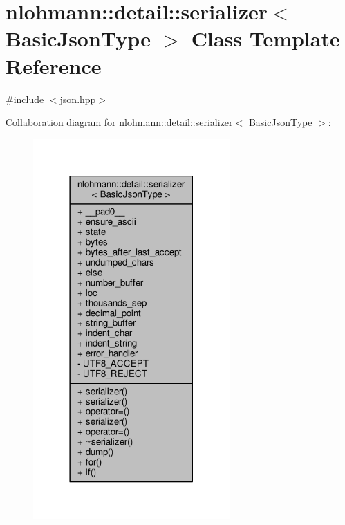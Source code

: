 \hypertarget{classnlohmann_1_1detail_1_1serializer}{}\section{nlohmann\+:\+:detail\+:\+:serializer$<$ Basic\+Json\+Type $>$ Class Template Reference}
\label{classnlohmann_1_1detail_1_1serializer}


{\ttfamily \#include $<$json.\+hpp$>$}



Collaboration diagram for nlohmann\+:\+:detail\+:\+:serializer$<$ Basic\+Json\+Type $>$\+:
\nopagebreak
\begin{figure}[H]
\begin{center}
\leavevmode
\includegraphics[width=213pt]{classnlohmann_1_1detail_1_1serializer__coll__graph}
\end{center}
\end{figure}
